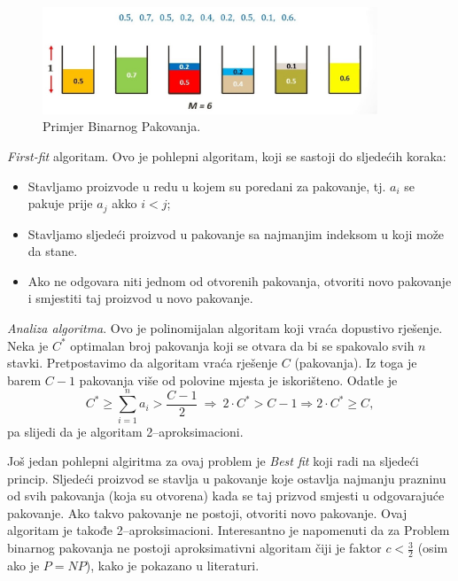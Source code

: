 \documentclass[a4paper, utf8, 11pt, colorlinks]{book}
\begin{document}
\begin{figure}
	\centering
	\includegraphics[width=100mm]{maxresdefault.eps}%
	\caption{Primjer Binarnog Pakovanja.}
    \label{fig:bin-packing}
\end{figure}
 \emph{First-fit} algoritam. Ovo je pohlepni algoritam, koji se sastoji do sljedećih koraka:
\begin{itemize}
	\item Stavljamo proizvode u redu u kojem su poredani za pakovanje, tj. $a_i$ se pakuje prije $a_j$ akko $i < j$;
	\item Stavljamo sljedeći proizvod u pakovanje sa najmanjim indeksom u koji može da stane. \item Ako ne odgovara niti jednom od otvorenih pakovanja, otvoriti novo pakovanje i smjestiti taj proizvod u novo pakovanje.
\end{itemize}


\noindent \emph{Analiza algoritma}. Ovo je polinomijalan algoritam koji vraća dopustivo rješenje.  Neka je $C^*$ optimalan broj pakovanja koji se otvara da bi se spakovalo svih $n$ stavki. Pretpostavimo da algoritam vraća rješenje $C$ (pakovanja). Iz toga je barem $C-1$ pakovanja više od polovine mjesta je iskorišteno. Odatle je
$$C^* \geq \sum_{i=1}^n a_i > \frac{C-1}{2}\ \Rightarrow\  2 \cdot C^* > C-1 \Rightarrow 2 \cdot C^* \geq C,$$
pa slijedi da je algoritam 2--aproksimacioni. 

 Još jedan pohlepni algiritma za ovaj problem je \emph{Best fit} koji radi na sljedeći princip. Sljedeći proizvod se stavlja u pakovanje koje ostavlja najmanju prazninu od svih pakovanja (koja su otvorena) kada se taj prizvod smjesti u odgovarajuće pakovanje. Ako takvo pakovanje ne postoji, otvoriti novo pakovanje. 
Ovaj algoritam je takođe 2--aproksimacioni. Interesantno je napomenuti da za Problem binarnog pakovanja ne postoji aproksimativni algoritam čiji je faktor $c <\frac{3}{2}$ (osim ako je $P=NP$), kako je pokazano u literaturi. 
\end{document}
